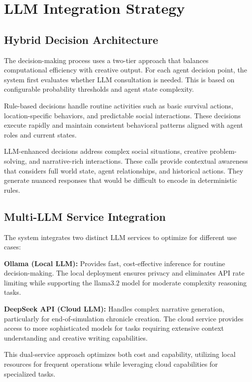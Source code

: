 \documentclass[conference]{IEEEtran}
\begin{document}
\section{LLM Integration Strategy}

\subsection{Hybrid Decision Architecture}

The decision-making process uses a two-tier approach that balances computational efficiency with creative output. For each agent decision point, the system first evaluates whether LLM consultation is needed. This is based on configurable probability thresholds and agent state complexity.

Rule-based decisions handle routine activities such as basic survival actions, location-specific behaviors, and predictable social interactions. These decisions execute rapidly and maintain consistent behavioral patterns aligned with agent roles and current states.

LLM-enhanced decisions address complex social situations, creative problem-solving, and narrative-rich interactions. These calls provide contextual awareness that considers full world state, agent relationships, and historical actions. They generate nuanced responses that would be difficult to encode in deterministic rules.

\subsection{Multi-LLM Service Integration}

The system integrates two distinct LLM services to optimize for different use cases:

\textbf{Ollama (Local LLM):} Provides fast, cost-effective inference for routine decision-making. The local deployment ensures privacy and eliminates API rate limiting while supporting the llama3.2 model for moderate complexity reasoning tasks.

\textbf{DeepSeek API (Cloud LLM):} Handles complex narrative generation, particularly for end-of-simulation chronicle creation. The cloud service provides access to more sophisticated models for tasks requiring extensive context understanding and creative writing capabilities.

This dual-service approach optimizes both cost and capability, utilizing local resources for frequent operations while leveraging cloud capabilities for specialized tasks.
\end{document}
